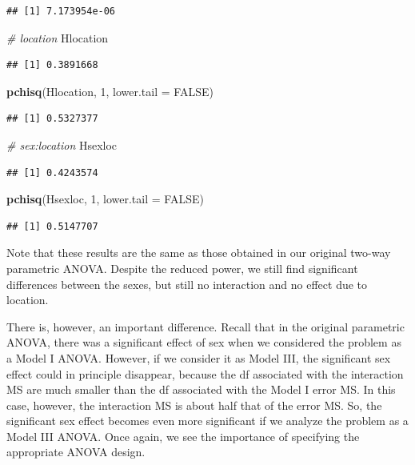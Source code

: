 \documentclass[
  12pt,
]{book}
\newenvironment{Shaded}{\begin{snugshade}}{\end{snugshade}}
\newcommand{\CommentTok}[1]{\textcolor[rgb]{0.56,0.35,0.01}{\textit{#1}}}
\newcommand{\DataTypeTok}[1]{\textcolor[rgb]{0.13,0.29,0.53}{#1}}
\newcommand{\DecValTok}[1]{\textcolor[rgb]{0.00,0.00,0.81}{#1}}
\newcommand{\KeywordTok}[1]{\textcolor[rgb]{0.13,0.29,0.53}{\textbf{#1}}}
\newcommand{\NormalTok}[1]{#1}
\newcommand{\OtherTok}[1]{\textcolor[rgb]{0.56,0.35,0.01}{#1}}
\begin{document}
\begin{verbatim}
## [1] 7.173954e-06
\end{verbatim}

\begin{Shaded}
\begin{Highlighting}[]
\CommentTok{\# location}
\NormalTok{Hlocation}
\end{Highlighting}
\end{Shaded}

\begin{verbatim}
## [1] 0.3891668
\end{verbatim}

\begin{Shaded}
\begin{Highlighting}[]
\KeywordTok{pchisq}\NormalTok{(Hlocation, }\DecValTok{1}\NormalTok{, }\DataTypeTok{lower.tail =} \OtherTok{FALSE}\NormalTok{)}
\end{Highlighting}
\end{Shaded}

\begin{verbatim}
## [1] 0.5327377
\end{verbatim}

\begin{Shaded}
\begin{Highlighting}[]
\CommentTok{\# sex:location}
\NormalTok{Hsexloc}
\end{Highlighting}
\end{Shaded}

\begin{verbatim}
## [1] 0.4243574
\end{verbatim}

\begin{Shaded}
\begin{Highlighting}[]
\KeywordTok{pchisq}\NormalTok{(Hsexloc, }\DecValTok{1}\NormalTok{, }\DataTypeTok{lower.tail =} \OtherTok{FALSE}\NormalTok{)}
\end{Highlighting}
\end{Shaded}

\begin{verbatim}
## [1] 0.5147707
\end{verbatim}

Note that these results are the same as those obtained in our original two-way parametric ANOVA. Despite the reduced power, we still find significant differences between the sexes, but still no interaction and no effect due to location.

There is, however, an important difference. Recall that in the original parametric ANOVA, there was a significant effect of sex when we considered the problem as a Model I ANOVA. However, if we consider it as Model III, the significant sex effect could in principle disappear, because the df associated with the interaction MS are much smaller than the df associated with the Model I error MS. In this case, however, the interaction MS is about half that of the error MS. So, the significant sex effect becomes even more significant if we analyze the problem as a Model III ANOVA. Once again, we see the importance of specifying the appropriate ANOVA design.
\end{document}
